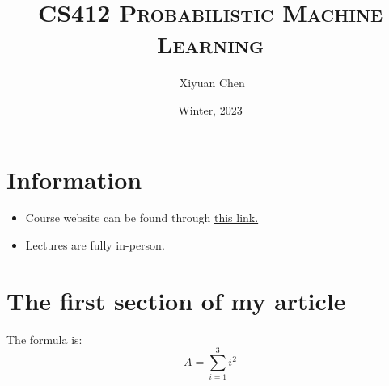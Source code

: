 \documentclass{ainote}
\author{\ccLogo \,\,Xiyuan Chen}
\title{\textsc{CS412 Probabilistic Machine Learning}}
\date{Winter, 2023}
\begin{document}
\maketitle
\doclicenseThis
\section*{Information}
\begin{itemize}
	\item Course website can be found through \href{https://michalmalyska.github.io/csc412/}{this link. }
	\item Lectures are fully in-person. 
\end{itemize}
\tableofcontents
\newpage

\section{The first section of my article}
\begin{info}
    The formula is: 
    \begin{equation}
    \label{eqa:1}
        A=\sum_{i=1}^3 i^2
    \end{equation}
\end{info}
\end{document}
